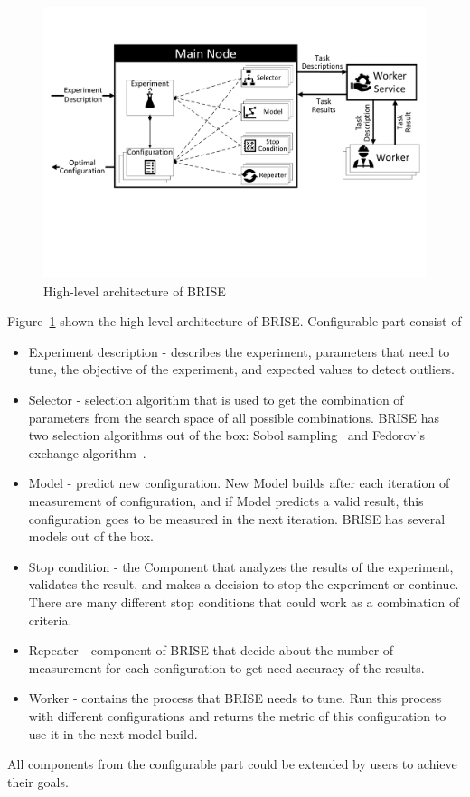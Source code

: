 \begin{figure}
	\centering
	\includegraphics[width=\textwidth]{images/BRISEarch.pdf}
	\caption{High-level architecture of BRISE}
	\label{fig:BRISEarch}
\end{figure}

Figure~\ref{fig:BRISEarch} shown the high-level architecture of BRISE.
Configurable part consist of 
\begin{itemize}
	\item Experiment description - describes the experiment, parameters that need to tune, the objective of the experiment, and expected values to detect outliers.
	\item Selector - selection algorithm that is used to get the combination of parameters from the search space of all possible combinations. BRISE has two selection algorithms out of the box: Sobol sampling~\cite{sobol99} and Fedorov's exchange algorithm~\cite{fedorov13}. 
	\item Model - predict new configuration. New Model builds after each iteration of measurement of configuration, and if Model predicts a valid result, this configuration goes to be measured in the next iteration. BRISE has several models out of the box.
	\item Stop condition - the Component that analyzes the results of the experiment, validates the result, and makes a decision to stop the experiment or continue. There are many different stop conditions that could work as a combination of criteria.
	\item Repeater - component of BRISE that decide about the number of measurement for each configuration to get need accuracy of the results. 
	\item Worker - contains the process that BRISE needs to tune. Run this process with different configurations and returns the metric of this configuration to use it in the next model build.
\end{itemize}
All components from the configurable part could be extended by users to achieve their goals.









